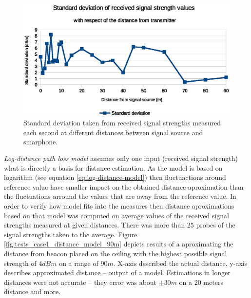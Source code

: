 \documentclass[../main.tex]{subfiles}
\begin{document}
\begin{figure}[!htbp]
\includegraphics[width=\textwidth, keepaspectratio]{pictures/tests_case1_fluctuations_over_time_std_dev}
\centering
\caption{Standard deviation taken from received signal strengths measured each second at different distances between signal source and smarphone.}
\label{fig:tests_case1_fluctuations_over_time_std_dev}
\end{figure}

\textit{Log-distance path loss model} assumes only one input (received signal strength) what is directly a basis for distance estimation. As the model is based on logarithm (see equation \ref{eq:log-distance-model}) then fluctuactions around reference value have smaller impact on the obtained distance aproximation than the fluctuations arround the values that are away from the reference value. In order to verify how model fits into the measures then distance aproximations based on that model was computed on average values of the received signal strengths measured at given distances. There was more than 25 probes of the signal strengths taken to the average. Figure \ref{fig:tests_case1_distance_model_90m} depicts results of a aproximating the distance from beacon placed on the ceiling with the highest possible signal strength of $4dBm$ on a range of $90 m$. X-axis described the actual distance, y-axis describes approximated distance -- output of a model. Estimations in longer distances were not accurate -- they error was about $\pm 30m$ on a $20$ meters distance and more.
\end{document}
